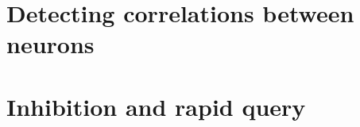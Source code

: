 \documentclass[twocolumn]{article}
\begin{document}
\section{\label{sec:correlations}Detecting correlations between neurons}

\begin{figure} 
\end{figure}

\section{\label{sec:inhibition_and_rapid_query}Inhibition and rapid query}

\begin{figure} 
\end{figure}
\end{document}
